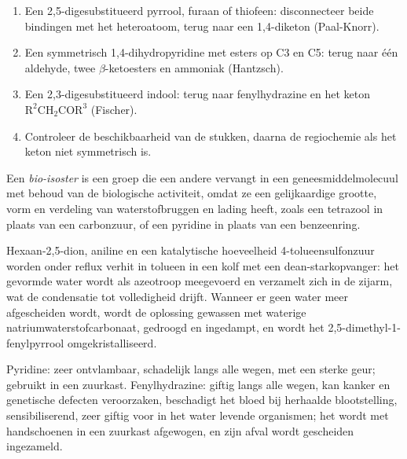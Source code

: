 \begin{method}\label{met:b3:heterocycles:disconnect}
\begin{enumerate}
  \item Een 2,5-digesubstitueerd pyrrool, furaan of thiofeen: disconnecteer
        beide bindingen met het heteroatoom, terug naar een 1,4-diketon
        (Paal-Knorr).
  \item Een symmetrisch 1,4-dihydropyridine met esters op C3 en C5: terug
        naar één aldehyde, twee $\beta$-ketoesters en ammoniak (Hantzsch).
  \item Een 2,3-digesubstitueerd indool: terug naar fenylhydrazine en het
        keton
        $\mathrm{R^2CH_2COR^3}$ (Fischer).
  \item Controleer de beschikbaarheid van de stukken, daarna de
        regiochemie als het keton niet symmetrisch is.
\end{enumerate}
\end{method}

\begin{definition}\label{def:b3:heterocycles:bioisostere}
Een \emph{bio-isoster} is een groep die een andere
vervangt in een geneesmiddelmolecuul met behoud van de biologische
activiteit, omdat ze een gelijkaardige grootte, vorm en verdeling van
waterstofbruggen en lading heeft, zoals een tetrazool in plaats van een
carbonzuur, of een pyridine in plaats van een benzeenring.
\end{definition}

\begin{inthelab}
Hexaan-2,5-dion, aniline en een katalytische hoeveelheid
4-tolueensulfonzuur worden onder reflux verhit in tolueen in een kolf
met een dean-starkopvanger: het gevormde water wordt als azeotroop
meegevoerd en verzamelt zich in de zijarm, wat de condensatie tot
volledigheid drijft. Wanneer er geen water meer afgescheiden wordt, wordt
de oplossing gewassen met waterige natriumwaterstofcarbonaat, gedroogd en
ingedampt, en wordt het 2,5-dimethyl-1-fenylpyrrool omgekristalliseerd.
\end{inthelab}

\begin{safety}{}
Pyridine: zeer ontvlambaar, schadelijk langs alle wegen, met een sterke
geur; gebruikt in een zuurkast. Fenylhydrazine: giftig langs alle wegen,
kan kanker en genetische defecten veroorzaken, beschadigt het bloed bij
herhaalde blootstelling, sensibiliserend, zeer giftig voor in het water
levende organismen; het wordt met handschoenen in een zuurkast
afgewogen, en zijn afval wordt gescheiden ingezameld.
\end{safety}

